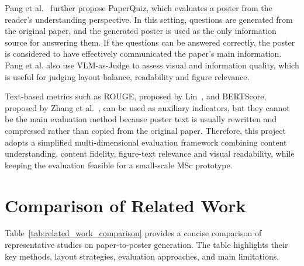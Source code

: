 \documentclass[12pt,oneside]{report}
\begin{document}
\vspace{1em}

Pang et al.~\cite{paper2poster} further propose PaperQuiz, which evaluates a poster from the reader's understanding perspective. In this setting, questions are generated from the original paper, and the generated poster is used as the only information source for answering them. If the questions can be answered correctly, the poster is considered to have effectively communicated the paper's main information. Pang et al. also use VLM-as-Judge to assess visual and information quality, which is useful for judging layout balance, readability and figure relevance.

\vspace{1em}

Text-based metrics such as ROUGE, proposed by Lin~\cite{rouge}, and BERTScore, proposed by Zhang et al.~\cite{bertscore}, can be used as auxiliary indicators, but they cannot be the main evaluation method because poster text is usually rewritten and compressed rather than copied from the original paper. Therefore, this project adopts a simplified multi-dimensional evaluation framework combining content understanding, content fidelity, figure-text relevance and visual readability, while keeping the evaluation feasible for a small-scale MSc prototype.


\section{Comparison of Related Work}

Table~\ref{tab:related_work_comparison} provides a concise comparison of representative studies on paper-to-poster generation. The table highlights their key methods, layout strategies, evaluation approaches, and main limitations.
\end{document}
